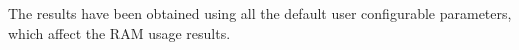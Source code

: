 The results have been obtained using all the default user configurable parameters, which affect the RAM usage results.
